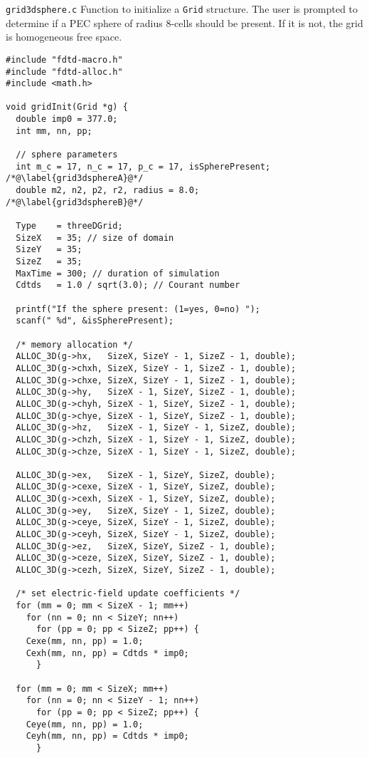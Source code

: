\begin{program}
  {\tt grid3dsphere.c} Function to initialize a {\tt Grid} structure.
  The user is prompted to determine if a PEC sphere of radius 8-cells
  should be present.  If it is not, the grid is homogeneous free
  space.
\label{pro:grid3dsphere}
\codemiddle
\begin{lstlisting}
#include "fdtd-macro.h"
#include "fdtd-alloc.h"
#include <math.h>

void gridInit(Grid *g) {
  double imp0 = 377.0;
  int mm, nn, pp;

  // sphere parameters
  int m_c = 17, n_c = 17, p_c = 17, isSpherePresent; /*@\label{grid3dsphereA}@*/
  double m2, n2, p2, r2, radius = 8.0;              /*@\label{grid3dsphereB}@*/

  Type    = threeDGrid;
  SizeX   = 35; // size of domain
  SizeY   = 35;
  SizeZ   = 35;
  MaxTime = 300; // duration of simulation
  Cdtds   = 1.0 / sqrt(3.0); // Courant number

  printf("If the sphere present: (1=yes, 0=no) ");
  scanf(" %d", &isSpherePresent);

  /* memory allocation */
  ALLOC_3D(g->hx,   SizeX, SizeY - 1, SizeZ - 1, double);
  ALLOC_3D(g->chxh, SizeX, SizeY - 1, SizeZ - 1, double);
  ALLOC_3D(g->chxe, SizeX, SizeY - 1, SizeZ - 1, double);
  ALLOC_3D(g->hy,   SizeX - 1, SizeY, SizeZ - 1, double);
  ALLOC_3D(g->chyh, SizeX - 1, SizeY, SizeZ - 1, double);
  ALLOC_3D(g->chye, SizeX - 1, SizeY, SizeZ - 1, double);
  ALLOC_3D(g->hz,   SizeX - 1, SizeY - 1, SizeZ, double);
  ALLOC_3D(g->chzh, SizeX - 1, SizeY - 1, SizeZ, double);
  ALLOC_3D(g->chze, SizeX - 1, SizeY - 1, SizeZ, double);

  ALLOC_3D(g->ex,   SizeX - 1, SizeY, SizeZ, double);
  ALLOC_3D(g->cexe, SizeX - 1, SizeY, SizeZ, double);
  ALLOC_3D(g->cexh, SizeX - 1, SizeY, SizeZ, double);
  ALLOC_3D(g->ey,   SizeX, SizeY - 1, SizeZ, double);
  ALLOC_3D(g->ceye, SizeX, SizeY - 1, SizeZ, double);
  ALLOC_3D(g->ceyh, SizeX, SizeY - 1, SizeZ, double);
  ALLOC_3D(g->ez,   SizeX, SizeY, SizeZ - 1, double);
  ALLOC_3D(g->ceze, SizeX, SizeY, SizeZ - 1, double);
  ALLOC_3D(g->cezh, SizeX, SizeY, SizeZ - 1, double);
  
  /* set electric-field update coefficients */
  for (mm = 0; mm < SizeX - 1; mm++)
    for (nn = 0; nn < SizeY; nn++) 
      for (pp = 0; pp < SizeZ; pp++) {
	Cexe(mm, nn, pp) = 1.0;
	Cexh(mm, nn, pp) = Cdtds * imp0;
      }

  for (mm = 0; mm < SizeX; mm++)
    for (nn = 0; nn < SizeY - 1; nn++) 
      for (pp = 0; pp < SizeZ; pp++) {
	Ceye(mm, nn, pp) = 1.0;
	Ceyh(mm, nn, pp) = Cdtds * imp0;
      }


\end{lstlisting}
\end{program}
